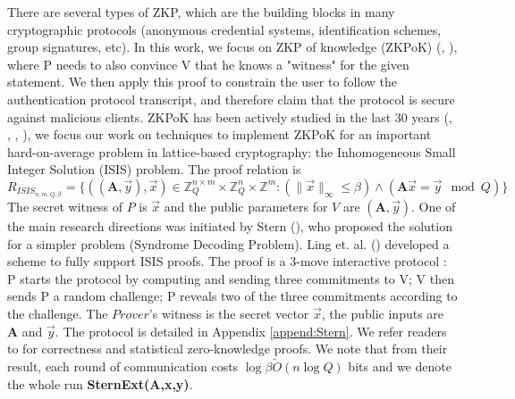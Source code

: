 There are several types of ZKP, which are the building blocks in many
cryptographic protocols (anonymous credential systems, identification schemes,
group signatures, etc). In this work, we focus on ZKP of knowledge (ZKPoK)
(\cite{bellare1992defining}, \cite{goldwasser1989knowledge}), where P needs to
also convince V that he knows a "witness" for the given statement. We then apply
this proof to constrain the user to follow the authentication protocol transcript,
and therefore claim that the protocol is secure against malicious clients.
ZKPoK has been actively studied in the last 30 years (\cite{feige1988zero},
\cite{rackoff1991non}, \cite{micciancio2003statistical},
\cite{ling2013improved}), we focus our work on techniques to implement ZKPoK for an
important hard-on-average problem in lattice-based cryptography: the
Inhomogeneous Small Integer Solution (ISIS) problem. The proof relation is
\[ R_{ISIS_{n,m,Q,\beta}} = \{ ((\mathbf{A},\vec{y}),\vec{x}) \in
  \mathbb{Z}_Q^{n\times m} \times \mathbb{Z}_Q^n \times \mathbb{Z}^m:
  (\|\vec{x}\|_\infty \leq \beta) \land (\mathbf{A}\vec{x} = \vec{y} \mod Q) \}
\]
The secret witness of \(P\) is \(\vec{x}\) and the public parameters for \(V\)
are \((\mathbf{A},\vec{y})\).  One of the main research directions was initiated
by Stern (\cite{stern1993new}), who proposed the solution for a simpler problem
(Syndrome Decoding Problem).  Ling et. al. (\cite{ling2013improved}) developed a
scheme to fully support ISIS proofs. The proof is a 3-move interactive protocol
: P starts the protocol by computing and sending three commitments to V; V then
sends P a random challenge; P reveals two of the three commitments according
to the challenge. The $Prover$'s witness is the secret vector $\vec{x}$, the
public inputs are $\mathbf{A}$ and $\vec{y}$. The protocol is detailed in
Appendix \ref{append:Stern}. We refer readers to \cite{ling2013improved} for
correctness and statistical zero-knowledge proofs. We note that from their
result, each round of communication costs $\log\beta\tilde{O}(n \log Q)$ bits
and we denote the whole run \textbf{SternExt(A,x,y)}.


